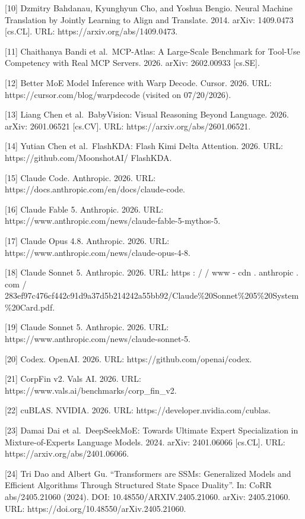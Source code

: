 \documentclass[
  10
]{article}
\begin{document}
{[}10{]} Dzmitry Bahdanau, Kyunghyun Cho, and Yoshua Bengio. Neural
Machine Translation by Jointly Learning to Align and Translate. 2014.
arXiv: 1409.0473 {[}cs.CL{]}. URL: https://arxiv.org/abs/1409.0473.

{[}11{]} Chaithanya Bandi et al.~MCP-Atlas: A Large-Scale Benchmark for
Tool-Use Competency with Real MCP Servers. 2026. arXiv: 2602.00933
{[}cs.SE{]}.

{[}12{]} Better MoE Model Inference with Warp Decode. Cursor. 2026. URL:
https://cursor.com/blog/warpdecode (visited on 07/20/2026).

{[}13{]} Liang Chen et al.~BabyVision: Visual Reasoning Beyond Language.
2026. arXiv: 2601.06521 {[}cs.CV{]}. URL:
https://arxiv.org/abs/2601.06521.

{[}14{]} Yutian Chen et al.~FlashKDA: Flash Kimi Delta Attention. 2026.
URL: https://github.com/MoonshotAI/ FlashKDA.

{[}15{]} Claude Code. Anthropic. 2026. URL:
https://docs.anthropic.com/en/docs/claude-code.

{[}16{]} Claude Fable 5. Anthropic. 2026. URL:
https://www.anthropic.com/news/claude-fable-5-mythos-5.

{[}17{]} Claude Opus 4.8. Anthropic. 2026. URL:
https://www.anthropic.com/news/claude-opus-4-8.

{[}18{]} Claude Sonnet 5. Anthropic. 2026. URL: https : / / www - cdn .
anthropic . com /
283ef97c476cf442c91d9a37d5b214242a55bb92/Claude\%20Sonnet\%205\%20System\%20Card.pdf.

{[}19{]} Claude Sonnet 5. Anthropic. 2026. URL:
https://www.anthropic.com/news/claude-sonnet-5.

{[}20{]} Codex. OpenAI. 2026. URL: https://github.com/openai/codex.

{[}21{]} CorpFin v2. Vals AI. 2026. URL:
https://www.vals.ai/benchmarks/corp\_fin\_v2.

{[}22{]} cuBLAS. NVIDIA. 2026. URL: https://developer.nvidia.com/cublas.

{[}23{]} Damai Dai et al.~DeepSeekMoE: Towards Ultimate Expert
Specialization in Mixture-of-Experts Language Models. 2024. arXiv:
2401.06066 {[}cs.CL{]}. URL: https://arxiv.org/abs/2401.06066.

{[}24{]} Tri Dao and Albert Gu. ``Transformers are SSMs: Generalized
Models and Efficient Algorithms Through Structured State Space
Duality''. In: CoRR abs/2405.21060 (2024). DOI:
10.48550/ARXIV.2405.21060. arXiv: 2405.21060. URL:
https://doi.org/10.48550/arXiv.2405.21060.
\end{document}
